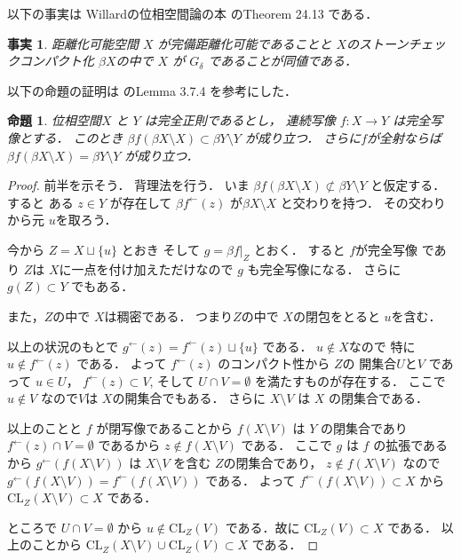 \documentclass[leqno, a4paper, 12pt]{jsarticle}
\newtheorem{prop}[thm]{命題}
\newtheorem{fact}[thm]{事実}
\newcommand{\cl}{\mathrm{CL}}
\newcommand{\myinv}[1]{#1^{\gets}}
\begin{document}
以下の事実は
Willardの位相空間論の本
\cite{MR2048350}
のTheorem 24.13
である．
\begin{fact}\label{fact:gdgd}
距離化可能空間
$X$
が完備距離化可能であることと
$X$のストーンチェックコンパクト化
$\beta X$の中で
$X$
が
$G_{\delta}$
であることが同値である．
\end{fact}

以下の命題の証明は
\cite{MR1039321}
のLemma 3.7.4
を参考にした．
\begin{prop}\label{prop:beta}
位相空間$X$
と
$Y$
は完全正則であるとし，
連続写像
$f\colon X\to Y$
は完全写像とする．
このとき
$\beta f(\beta X \setminus X)\subset \beta Y\setminus Y$
が成り立つ．
さらに$f$が全射ならば
$\beta f(\beta X \setminus X)= \beta Y\setminus Y$
が成り立つ．
\end{prop}
\begin{proof}
前半を示そう．
背理法を行う．
いま
$\beta f(\beta X \setminus X)
\not \subset \beta Y\setminus Y$
と仮定する．
すると
ある
$z\in Y$
が存在して
$\myinv{\beta f}(z)$
が$\beta X\setminus X$
と交わりを持つ．
その交わりから元
$u$を取ろう．

今から
$Z=X\sqcup \{u\}$
とおき
そして
$g=\beta f |_{Z}$
とおく．
すると
$f$が完全写像
であり
$Z$は
$X$に一点を付け加えただけなので
$g$
も完全写像になる．
さらに
$g(Z)\subset Y$
でもある．

また，$Z$の中で
$X$は稠密である．
つまり$Z$の中で
$X$の閉包をとると
$u$を含む．

以上の状況のもとで
$\myinv{g}(z)=\myinv{f}(z)\sqcup \{u\}$
である．
$u\not\in X$なので
特に
$u\not \in \myinv{f}(z)$
である．
よって
$\myinv{f}(z)$
のコンパクト性から
$Z$の
開集合$U$と$V$
であって
$u\in U$，
$\myinv{f}(z)\subset V$, 
そして
$U\cap V=\emptyset$
を満たすものが存在する．
ここで$u\not\in V$
なので$V$は
$X$の開集合でもある．
さらに
$X\setminus V$
は
$X$
の閉集合である．


以上のことと
$f$
が閉写像であることから
$f(X\setminus V)$
は
$Y$
の閉集合であり
$\myinv{f}(z)\cap V=\emptyset$
であるから
$z\not \in f(X\setminus V)$
である．
ここで
$g$
は
$f$
の拡張であるから
$\myinv{g}(f(X\setminus V))$
は
$X\setminus V$
を含む
$Z$の閉集合であり，
$z\not \in f(X\setminus V)$
なので
$\myinv{g}(f(X\setminus V))=\myinv{f}(f(X\setminus V))$
である．
よって
$\myinv{f}(f(X\setminus V))\subset X$
から
$\cl_{Z}(X\setminus V)\subset X$
である．


ところで
$U\cap V=\emptyset$
から
$u\not \in \cl_{Z}(V)$
である．故に
$\cl_{Z}(V)\subset X$
である．
以上のことから
$\cl_{Z}(X\setminus V)\cup \cl_{Z}(V)\subset X$
である．


\end{proof}
\end{document}
